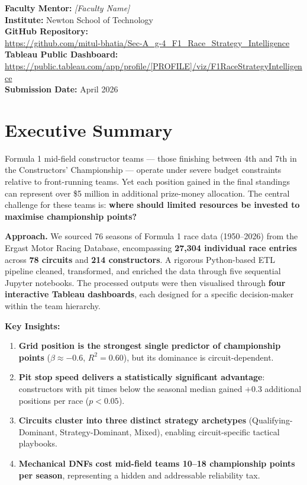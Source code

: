 \documentclass[12pt, a4paper]{article}
\begin{document}
\begin{center}
\textbf{Faculty Mentor:} \textit{[Faculty Name]}\\[0.3cm]
\textbf{Institute:} Newton School of Technology\\[0.5cm]

\textbf{GitHub Repository:}\\
\url{https://github.com/mitul-bhatia/Sec-A_g-4_F1_Race_Strategy_Intelligence}\\[0.3cm]

\textbf{Tableau Public Dashboard:}\\
\url{https://public.tableau.com/app/profile/[PROFILE]/viz/F1RaceStrategyIntelligence}\\[0.3cm]

\textbf{Submission Date:} April 2026

\end{center}
\newpage

\section{Executive Summary}

Formula 1 mid-field constructor teams --- those finishing between 4th and 7th in the Constructors' Championship --- operate under severe budget constraints relative to front-running teams. Yet each position gained in the final standings can represent over \$5 million in additional prize-money allocation. The central challenge for these teams is: \textbf{where should limited resources be invested to maximise championship points?}

\textbf{Approach.} We sourced 76 seasons of Formula 1 race data (1950--2026) from the Ergast Motor Racing Database, encompassing \textbf{27,304 individual race entries} across \textbf{78 circuits} and \textbf{214 constructors}. A rigorous Python-based ETL pipeline cleaned, transformed, and enriched the data through five sequential Jupyter notebooks. The processed outputs were then visualised through \textbf{four interactive Tableau dashboards}, each designed for a specific decision-maker within the team hierarchy.

\textbf{Key Insights:}
\begin{enumerate}
    \item \textbf{Grid position is the strongest single predictor of championship points} ($\beta \approx -0.6$, $R^2 = 0.60$), but its dominance is circuit-dependent.
    \item \textbf{Pit stop speed delivers a statistically significant advantage}: constructors with pit times below the seasonal median gained +0.3 additional positions per race ($p < 0.05$).
    \item \textbf{Circuits cluster into three distinct strategy archetypes} (Qualifying-Dominant, Strategy-Dominant, Mixed), enabling circuit-specific tactical playbooks.
    \item \textbf{Mechanical DNFs cost mid-field teams 10--18 championship points per season}, representing a hidden and addressable reliability tax.
\end{enumerate}
\end{document}
